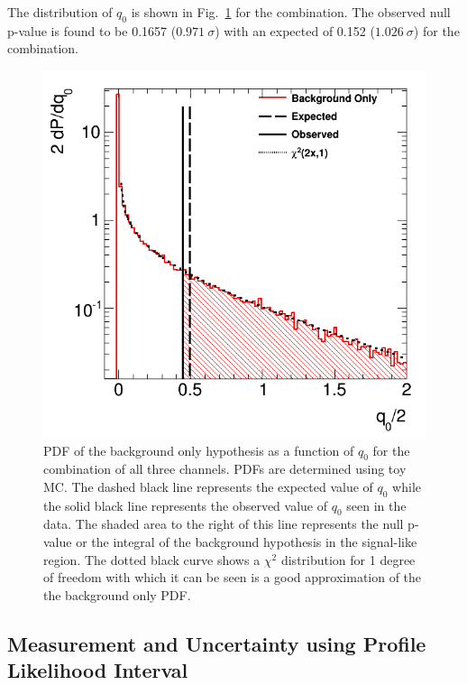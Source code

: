 The distribution of $q_0$ is shown in Fig.~\ref{fig:stat_measurement_significance} for the combination.  
The observed null p-value 
is found to be 0.1657 ($0.971~\sigma$) with an expected of 0.152 ($1.026~\sigma$) for the combination.

\begin{figure}[ht!]
\centering
\includegraphics[width=0.70\columnwidth]{figures/combination/significance.png}
\caption{PDF of the background only hypothesis as a function of $q_0$ for the combination of all three channels. PDFs are determined 
using toy MC. The dashed black line represents the expected value of $q_0$ while the solid black line represents the observed value of $q_0$ seen in the data. The shaded area to the right
of this line represents the null p-value or the 
integral of the background hypothesis in the signal-like region.
The dotted black curve shows a $\chi^2$ distribution for 1 degree of freedom with which 
it can be seen is a good approximation of the 
the background only PDF.}
\label{fig:stat_measurement_significance}
\end{figure}

\clearpage

\subsection{Measurement and Uncertainty using Profile Likelihood Interval}
\label{sec:measurement}

